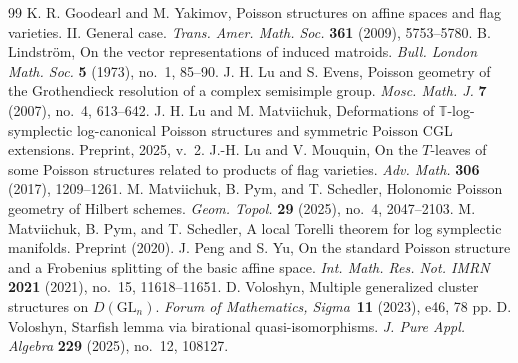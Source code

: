 \documentclass[11pt]{article}
\theoremstyle{definition}\newtheorem{definition}[theorem]{Definition}
\theoremstyle{definition}\newtheorem{remark}[theorem]{Remark}
\theoremstyle{remark}
\numberwithin{equation}{section}
\begin{document}
\begin{thebibliography}{99}
     K. R. Goodearl and M. Yakimov, Poisson structures on affine spaces and flag varieties. II. General case. \emph{Trans. Amer. Math. Soc.} \textbf{361} (2009), 5753--5780. 
     B. Lindstr\"om, On the vector representations of induced matroids. \emph{Bull. London Math. Soc.} \textbf{5} (1973), no.~1, 85--90. 
     J. H. Lu and S. Evens, Poisson geometry of the Grothendieck resolution of a complex semisimple group. \emph{Mosc. Math. J.} \textbf{7} (2007), no.~4, 613--642. 
     J. H. Lu and M. Matviichuk, Deformations of $\mathbb{T}$-log-symplectic log-canonical Poisson structures and symmetric Poisson CGL extensions. Preprint, 2025, v.~2. 
     J.-H. Lu and V. Mouquin, On the $T$-leaves of some Poisson structures related to products of flag varieties. \emph{Adv. Math.} \textbf{306} (2017), 1209--1261. 
    M. Matviichuk, B. Pym, and T. Schedler,
    Holonomic Poisson geometry of Hilbert schemes.
    \emph{Geom. Topol.} \textbf{29} (2025), no.~4, 2047--2103. 
    M. Matviichuk, B. Pym, and T. Schedler,
    A local Torelli theorem for log symplectic manifolds. Preprint (2020). 
     J. Peng and S. Yu, On the standard Poisson structure and a Frobenius splitting of the basic affine space. \emph{Int. Math. Res. Not. IMRN} \textbf{2021} (2021), no.~15, 11618--11651. 
      D. Voloshyn, Multiple generalized cluster structures on $D(\mathrm{GL}_n)$. \emph{Forum of Mathematics, Sigma}~\textbf{11} (2023), e46, 78 pp. 
     D. Voloshyn, Starfish lemma via birational quasi-isomorphisms. \emph{J. Pure Appl. Algebra} \textbf{229} (2025), no.~12, 108127. 
\end{thebibliography}
        
\end{document}
